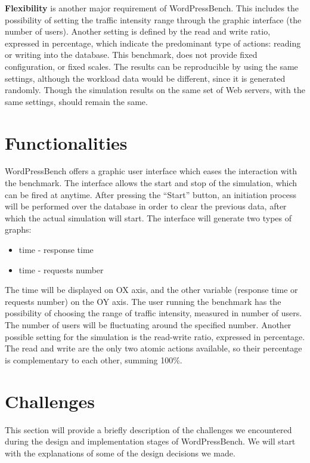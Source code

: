 \textbf{Flexibility} is another major requirement of WordPressBench. This includes the possibility of setting the traffic intensity range through the graphic interface (the number of users). Another setting is defined by the read and write ratio, expressed in percentage, which indicate the predominant type of actions: reading or writing into the database. This benchmark, does not provide fixed configuration, or fixed scales. The results can be reproducible by using the same settings, although the workload data would be different, since it is generated randomly. Though the simulation results on the same set of Web servers, with the same settings, should remain the same.

\section{Functionalities}
\label{sec:functionalities}

WordPressBench offers a graphic user interface which eases the interaction with the benchmark. The interface allows the start and stop of the simulation, which can be fired at anytime. After pressing the “Start” button, an initiation process will be performed over the database in order to clear the previous data, after which the actual simulation will start. 
The interface will generate two types of graphs: 
\begin{itemize}
 \item time - response time 
 \item time - requests number
\end{itemize}
The time will be displayed on OX axis, and the other variable (response time or requests number) on the OY axis.
The user running the benchmark has the possibility of choosing the range of  traffic intensity, measured in number of users. The number of users will be fluctuating around the specified number. Another possible setting for the simulation is the read-write ratio, expressed in percentage. The read and write are the only two atomic actions available, so their percentage is complementary to each other, summing 100\%.

\section{Challenges}
\label{sec:challenges}

This section will provide a briefly description of the challenges we encountered during the design and implementation stages of WordPressBench. We will start with the explanations of some of the design decisions we made.

